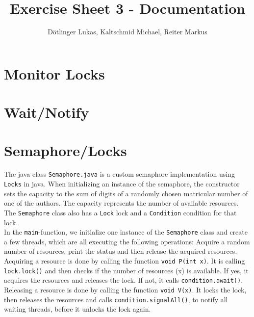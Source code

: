\documentclass{article}
\begin{document}
	\title{Exercise Sheet 3 - Documentation}
	\date{}
	\author{Dötlinger Lukas, Kaltschmid Michael, Reiter Markus}

	\maketitle

  \section{Monitor Locks}
  
  \section{Wait/Notify}
    

  \section{Semaphore/Locks}
  
    The java class \texttt{Semaphore.java} is a custom semaphore implementation using \texttt{Locks} in java. When initializing an instance of the semaphore, the constructor sets the capacity to the sum of digits of a randomly chosen matricular number of one of the authors. The capacity represents the number of available resources. The \texttt{Semaphore} class also has a \texttt{Lock} lock and a \texttt{Condition} condition for that lock.\\
    In the \texttt{main}-function, we initialize one instance of the \texttt{Semaphore} class and create a few threads, which are all executing the following operations: Acquire a random number of resources, print the status and then release the acquired resources.\\
    Acquiring a resource is done by calling the function \texttt{void P(int x)}. It is calling \texttt{lock.lock()} and then checks if the number of resources (x) is available. If yes, it acquires the resources and releases the lock. If not, it calls \texttt{condition.await()}. Releasing a resource is done by calling the function \texttt{void V(x)}. It locks the lock, then releases the resources and calls \texttt{condition.signalAll()}, to notify all waiting threads, before it unlocks the lock again.\\

  
\end{document}

